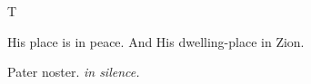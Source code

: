 ﻿%
\bigskip\bigskip{}
\def\matinsnocturn{3rd Nocturn}
%
\large
\def\preant{\setgrefactor{17}\large}
\def\prepsalm{\normalsize}
\def\anttranslation{God is my helper, and the Lord is the protector of my soul.}
\def\psalmtranslationsmall{T}
\let\prepsalm=\undefined
%
\printseparation
{
\def\preant{\setgrefactor{17}\large}
\def\prepsalm{\normalsize}
\def\psalmtranslationsmall{T}
\def\anttranslation{His place is in peace and His dwelling-place in Zion.}
\def\lalinebreakafterthree\undefined{T}
\let\prepsalm=\undefined
}
%
\printseparation{}
\vspace{-3pt}
{
\def\preant{\setgrefactor{17}\large}
\def\psalmtranslationsmall{T}
\def\anttranslation{I am become as a man without help, free among the dead.}
\def\lalinebreakafterseven{T}
\def\prepsalmverses{\vspace{-9pt}}
}

\bigskip\bigskip
{}
{His place is in peace.}
{And His dwelling-place in Zion.}

\bigskip
Pater noster. \emph{in silence.}


